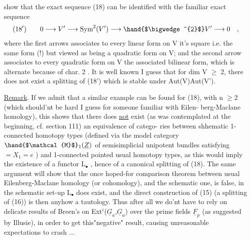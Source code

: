 
show that the exact sequence (18) can be identified with the familiar
exact sequence
\[ (18') \qquad 0 \longrightarrow V' \longrightarrow \mathrm{Sym}^2(V') \longrightarrow \hand{$\bigwedge^{2}$} V' \longrightarrow 0 \quad , \]
where the first arrows associates to every linear form on V it's square
i.e. the same form (!) but viewed as being a quadratic form on V; and
the second arrow associates to every quadratic form on V the associated
bilinear form, which is alternate because of char. 2 . It is well
known I guess that for dim V $\geqslant$ 2, there does not exist a splitting of
(18') which is stable under Aut(V)\hand{$\simeq$}Aut(V').

\uline{Remark}. If we admit that a similar example can be found for  (18), with
n $\geqslant$2 (which should'nt be hard I guess for someone familiar with Eilen-%
berg-Maclane homology), this shows that there does \uline{not} exist (as was
contemplated at the beginning, cf. section 111) an equivalence of catego-%
ries between shhematic 1-connected homotopy types (defined via the
model category $\hand{$\mathcal{M}$}_1(\underline{Z})$ of semisimplicial unipotent bundles  satisfying
$=X_1=e$ ) and 1-connected pointed usual homotopy types, as this would
imply the existence of a functor L\hand{$\Pi$}$_{\bullet}$ , \xout{\unsure{(**)}} hence of a canonical splitting
of (18). The same argument will show that the once hoped-for comparison
theorem between usual Eilenberg-Maclane homology (or cohomology), and
the schematic one, is false,   in the schematic set-up L\hand{$\Pi$}$_{\bullet}$ does
exist, and the direct construction of (15) (a  splitting of (16)) is
then anyhow a tautology. Thus after all we do'nt have to rely on
delicate results of Breen's on  Ext$^{i}$($\underline{G}_a$,$\underline{G}_a$) over the
prime fields $\underline{F}_p$  (as suggested by Illusie), in order
to get this"negative" result, causing unreasonable expectations to
crash ...


